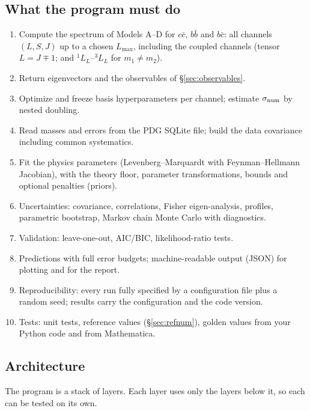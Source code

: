 \documentclass[11pt,a4paper]{article}
\numberwithin{equation}{section}
\theoremstyle{definition}
\theoremstyle{plain}
\theoremstyle{remark}
\numberwithin{algorithm}{section}
\begin{document}
\subsection{What the program must do}\label{sec:bp-req}
\begin{enumerate}[leftmargin=2.2em,itemsep=2pt]
\item[R1] Compute the spectrum of Models A--D for $c\bar c$, $b\bar b$ and $b\bar c$: all channels $(L,S,J)$ up to a chosen $L_{\max}$, including the coupled channels (tensor $L=J\mp1$; and ${}^1L_L$--${}^3L_L$ for $m_1\ne m_2$).
\item[R2] Return eigenvectors and the observables of \S\ref{sec:observables}.
\item[R3] Optimize and freeze basis hyperparameters per channel; estimate $\sigma_{\rm num}$ by nested doubling.
\item[R4] Read masses and errors from the PDG SQLite file; build the data covariance including common systematics.
\item[R5] Fit the physics parameters (Levenberg--Marquardt with Feynman--Hellmann Jacobian), with the theory floor, parameter transformations, bounds and optional penalties (priors).
\item[R6] Uncertainties: covariance, correlations, Fisher eigen-analysis, profiles, parametric bootstrap, Markov chain Monte Carlo with diagnostics.
\item[R7] Validation: leave-one-out, AIC/BIC, likelihood-ratio tests.
\item[R8] Predictions with full error budgets; machine-readable output (JSON) for plotting and for the report.
\item[R9] Reproducibility: every run fully specified by a configuration file plus a random seed; results carry the configuration and the code version.
\item[R10] Tests: unit tests, reference values (\S\ref{sec:refnum}), golden values from your Python code and from Mathematica.
\end{enumerate}

\subsection{Architecture}\label{sec:bp-arch}
The program is a stack of layers. Each layer uses only the layers below it, so each can be tested on its own.
\end{document}
